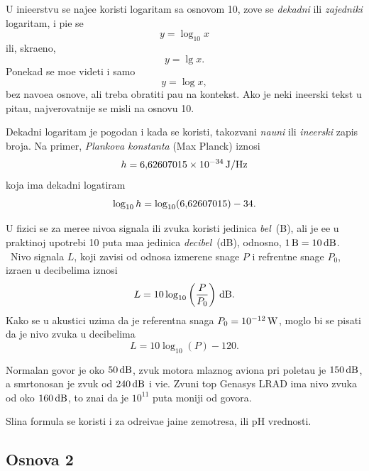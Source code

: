 \documentclass[12pt, twoside, a4paper]{article}
\def\logten{\log_{10}}
\def\puta{\times}
\def\.{\smash{,}\vphantom{.}}
\def\um#1{\,{\rm#1}}
\begin{document}
U ini{\zv}e{\nj}erstvu se naj{\cv}e{\sv}{\cc}e koristi logaritam sa osnovom 10,
zove se {\sl dekadni\/} ili {\sl zajedni{\cv}ki\/} logaritam, i pi{\sv}e se
$$
y=\logten x
$$
ili, skra{\cc}eno,
$$
y=\lg x.
$$
Ponekad se mo{\zv}e videti i samo
$$
y=\log x,
$$
bez navo{\dj}e{\nj}a osnove, ali treba obratiti pa{\zv}{\nj}u na kontekst.
Ako je neki in{\zv}e{\nj}erski tekst u pita{\nj}u, najverovatnije se misli na osnovu 10.

Dekadni logaritam je pogodan i kada se koristi, takozvani {\sl nau{\cv}ni\/} ili {\sl in{\zv}e{\nj}erski\/}
zapis broja.
Na primer, {\sl Plankova konstanta\/} (Max Planck) iznosi
$$
h=6\.62607015\puta 10^{-34}\um{J/Hz}
$$
koja ima dekadni logatiram
$$
\logten h=\logten(6\.62607015) - 34.
$$

U fizici se za mere{\nj}e nivoa signala ili zvuka koristi jedinica {\sl be\/l}~(B), ali je {\cv}e{\sv}{\cc}e
u prakti{\cv}noj upotrebi 10 puta ma{\nj}a jedinica {\sl decibel\/}~(dB), odnosno, $1\um{B}=10\um{dB}$. \
Nivo \hbox{sig\-na\-la} $L$, koji zavisi
od odnosa izmerene snage $P$ i refrentne snage $P_0$, izra{\zv}en u deci\-belima iznosi
$$
L=10\logten\left(\frac{P}{P_0}\right)\um{dB}.
$$
Kako se u akustici uzima da je referentna snaga $P_0=10^{-12}\um W$, moglo bi se pisati
da je nivo zvuka u decibelima
$$
L=10\logten(P)-120.
$$

Normalan govor je oko $50\um{dB}$, 
zvuk motora mlaznog aviona pri poleta{\nj}u je $150\um{dB}$, 
a smrtonosan je zvuk od $240\um{dB}$ i vi{\sv}e.
Zvu{\cv}ni top {\sf Genasys LRAD} ima nivo zvuka od oko $160\um{dB}$,
{\sv}to zna{\cv}i da je $10^{11}$ puta mo{\cc}niji od govora.

Sli{\cv}na formula se koristi i za odre{\dj}iva{\nj}e ja{\cv}ine zem{\lj}otresa, 
ili pH
vrednosti.

\subsection{Osnova 2}

\def\lb{\mathop{\rm lb}}
\def\bits{{\it bits}}
\def\mant{{\it mantisa}}%
\def\expo{{\it eksponent}}%
\def\znak{{\it znak}}%
\end{document}
